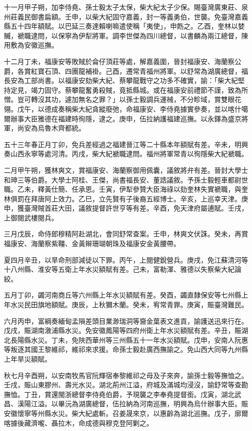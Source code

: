 \begin{pinyinscope}
十一月甲子朔，加李侍堯、孫士毅太子太保，柴大紀太子少保。賜臺灣廣東莊、泉州莊義民御書扁額。壬申，以柴大紀固守嘉義，封一等義勇伯，世襲。免臺灣嘉義縣五十四年額賦。以巴延三奏達賴喇嘛遣使稱「夷使」，申飭之。乙酉，奎林以婪贓，褫職逮問，以保寧為伊犁將軍。調李世傑為四川總督，以書麟為兩江總督，陳用敷為安徽巡撫。

十二月丁未，福康安等敗賊於侖仔頂莊等處，解嘉義圍，晉封福康安、海蘭察公爵，各賞紅寶石頂、四團龍補褂。己酉，遷常青福州將軍。以舒常為湖廣總督，福長安為工部尚書。以福康安劾柴大紀、蔡攀龍戰守之功多不確實，諭：「柴大紀堅持定見，竭力固守。蔡攀龍奮勇殺賊，竟抵縣城。或在福康安前禮節不謹，致為所憎。豈可轉沒其功，遽加無名之罪？」以孫士毅調兵運械，不分畛域，賞雙眼花翎。戊午，以德成奏稱柴大紀貪縱廢弛，命福康安、李侍堯據實參奏，並以喀什噶爾辦事大臣雅德在福建時徇隱，逮之。庚申，伍拉納護福建巡撫。以永鐸為盛京將軍，尚安為烏魯木齊都統。

五十三年春正月丁卯，免兵差經過之福建晉江等二十縣本年額賦有差。辛未，明興奏山西永寧等處河清。丙戌，柴大紀褫職逮問。福州將軍常青以徇隱柴大紀褫職。

二月甲午朔，獲林爽文，賞福康安、海蘭察御用佩囊，議敘將弁有差。晉封大學士和珅三等伯爵。大學士阿桂、王傑，尚書福長安、董誥議敘。予孫士毅輕車都尉世職。乙未，釋黃仕簡、任承恩。壬寅，伊犁參贊大臣海祿以劾奎林失實褫職，與奎林俱罰在拜唐阿上效力。乙巳，立先賢有子後裔五經博士。辛亥，上巡幸天津。庚申，獲臺灣賊首莊大田，議敘提督許世亨等有差。辛酉，免天津府屬逋賦。壬戌，上御閱武樓閱兵。

三月戊辰，命侍郎穆精阿赴湖北，會同舒常查案。壬申，林爽文伏誅。癸未，再賞福康安、海蘭察紫韁、金黃辮珊瑚朝珠及福康安金黃腰帶。

夏四月辛丑，以旱命刑部減徒以下罪。丙午，上閱健銳營兵。庚戌，免江蘇清河等十八州縣、淮安等五衛上年水災額賦有差。己未，富勒渾、雅德以失察柴大紀論絞。

五月丁卯，蠲河南商丘等六州縣上年水災額賦有差。癸酉，蠲直隸保安等七州縣上年水災民田旗地額賦。庚辰，上秋獮木蘭。癸未，宥常青罪。庚寅，賑臺灣難民。

六月丙申，富綱奏緬甸孟隕差頭目業渺瑞洞等齎金葉表文進貢，諭護送迅來行在。戊戌，賑湖南漵浦縣水災。免安徽鳳陽等四府州衛上年水災額賦有差。辛丑，賑湖北長陽縣水災。丁未，免陜西華州等三州縣五十一年水災額賦。戊申，安南人阮惠等叛逐其國王黎維祁，維祁來求援。命孫士毅赴廣西撫諭之。免山西大同等九州縣上年旱災額賦。

秋七月辛酉朔，以安南牧馬官阮輝宿奉黎維祁之母及子來奔，諭孫士毅等撫恤之。壬戌，賑山東膠州、壽光水災。湖北荊州江溢，府城及滿城均浸沒，諭舒常等查勘撫恤。丁丑，賞還閩浙總督李侍堯伯爵，予現襲之李奉堯提督銜。戊寅，湖北武昌、漢陽江溢。以畢沅為湖廣總督，伍拉納為河南巡撫，明興為烏什辦事大臣。賑安徽懷寧等州縣水災。柴大紀處斬。召姜晟來京，以惠齡為湖北巡撫。戊子，廓爾喀據後藏濟嚨、聶拉木，命成德與穆克登阿剿之。


\end{pinyinscope}
